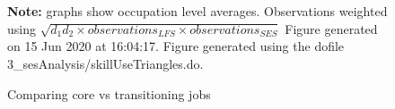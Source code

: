 \begin{figure}[!h]
\caption{Comparing core vs transitioning jobs}
  \\   \\ 
\par \begin{minipage}[h]{\textwidth}{\scriptsize\textbf{Note:} graphs show occupation level averages. Observations weighted using $ \sqrt{d_1d_2 \times observations_{LFS} \times observations_{SES} }$ Figure generated on 15 Jun 2020 at 16:04:17. Figure generated using the dofile 3\_sesAnalysis/skillUseTriangles.do.}\end{minipage}
\end{figure}
